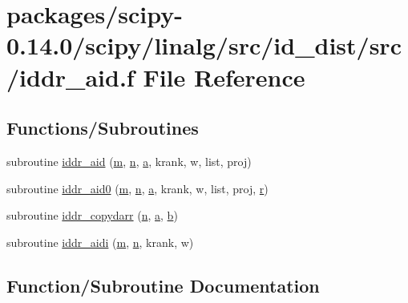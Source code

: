 \hypertarget{iddr__aid_8f}{}\section{packages/scipy-\/0.14.0/scipy/linalg/src/id\+\_\+dist/src/iddr\+\_\+aid.f File Reference}
\label{iddr__aid_8f}
\subsection*{Functions/\+Subroutines}
\begin{DoxyCompactItemize}
\item 
subroutine \hyperlink{iddr__aid_8f_a0d607d376e6a3d441ec0459678e8154b}{iddr\+\_\+aid} (\hyperlink{indexexpr_8h_ab72fdb4031d47b75ab26dd18a437bcdc}{m}, \hyperlink{indexexpr_8h_ab427e2e2b4d6cec55fa088ea2a692ace}{n}, \hyperlink{gen__mat5files_8m_aae328bf20413f220e38aec4d95bfd6da}{a}, krank, w, list, proj)
\item 
subroutine \hyperlink{iddr__aid_8f_aa05285b391ef74fa28c5af985ff0f0ba}{iddr\+\_\+aid0} (\hyperlink{indexexpr_8h_ab72fdb4031d47b75ab26dd18a437bcdc}{m}, \hyperlink{indexexpr_8h_ab427e2e2b4d6cec55fa088ea2a692ace}{n}, \hyperlink{gen__mat5files_8m_aae328bf20413f220e38aec4d95bfd6da}{a}, krank, w, list, proj, \hyperlink{indexexpr_8h_ac434fd11cc2493608d8d91424d60c17e}{r})
\item 
subroutine \hyperlink{iddr__aid_8f_a2b46379aee1745121d51f35dbfff01a2}{iddr\+\_\+copydarr} (\hyperlink{indexexpr_8h_ab427e2e2b4d6cec55fa088ea2a692ace}{n}, \hyperlink{gen__mat5files_8m_aae328bf20413f220e38aec4d95bfd6da}{a}, \hyperlink{gen__mat5files_8m_a7b38767b3b6a8dae167e5afa4fc340b0}{b})
\item 
subroutine \hyperlink{iddr__aid_8f_a00126e13266714a42493a7550ad95354}{iddr\+\_\+aidi} (\hyperlink{indexexpr_8h_ab72fdb4031d47b75ab26dd18a437bcdc}{m}, \hyperlink{indexexpr_8h_ab427e2e2b4d6cec55fa088ea2a692ace}{n}, krank, w)
\end{DoxyCompactItemize}


\subsection{Function/\+Subroutine Documentation}
\hypertarget{iddr__aid_8f_a0d607d376e6a3d441ec0459678e8154b}{}
